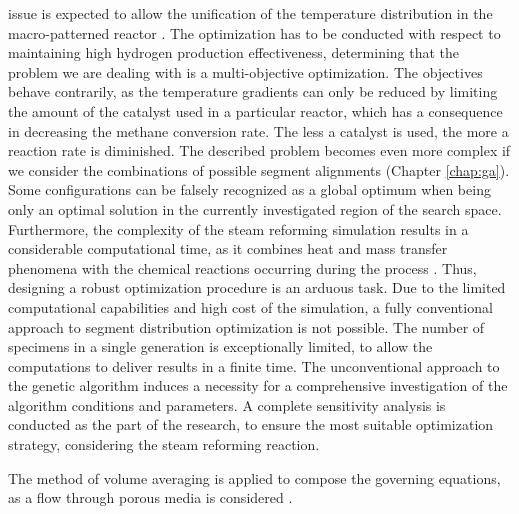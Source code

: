 issue is expected to allow the unification of the temperature distribution in the macro-patterned reactor \cite{Pajak2018}. The optimization has to be conducted with respect to maintaining high hydrogen production effectiveness, determining that the problem we are dealing with is a multi-objective optimization. The objectives behave contrarily, as the temperature gradients can only be reduced by limiting the amount of the catalyst used in a particular reactor, which has a consequence in decreasing the methane conversion rate. The less a catalyst is used, the more a reaction rate is diminished. The described problem becomes even more complex if we consider the combinations of possible segment alignments (Chapter \ref{chap:ga}). Some configurations can be falsely recognized as a global optimum when being only an optimal solution in the currently investigated region of the search space. Furthermore, the complexity of the steam reforming simulation results in a considerable computational time, as it combines heat and mass transfer phenomena with the chemical reactions occurring during the process \cite{Brus2012}. Thus, designing a robust optimization procedure is an arduous task. Due to the limited computational capabilities and high cost of the simulation, a fully conventional approach to segment distribution optimization is not possible. The number of specimens in a single generation is exceptionally limited, to allow the computations to deliver results in a finite time. The unconventional approach to the genetic algorithm induces a necessity for a comprehensive investigation of the algorithm conditions and parameters. A complete sensitivity analysis is conducted as the part of the research, to ensure the most suitable optimization strategy, considering the steam reforming reaction.










The method of volume averaging is applied to compose the governing equations, as a flow through porous media is considered \cite{Whitaker1999, Brus2014}.


